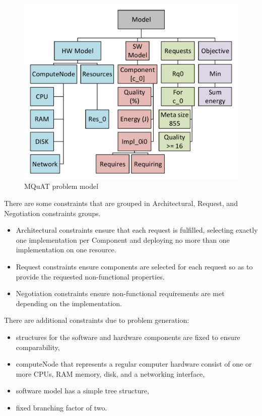 \begin{figure}
	\centering
	\includegraphics[width=\textwidth]{images/MQuATModel}
	\caption[MQuAT problem model]{MQuAT problem model}
	\label{fig:mquatmodel}
\end{figure}

There are some constraints that are grouped in Architectural, Request, and Negotiation constraints groups.
\begin{itemize}
	\item Architectural constraints ensure that each request is fulfilled, selecting exactly one implementation per Component and deploying no more than one implementation on one resource.
	\item Request constraints ensure components are selected for each request so as to provide the requested non-functional properties.
	\item Negotiation constraints ensure non-functional requirements are met depending on the implementation.
\end{itemize}
There are additional constraints due to problem generation:
\begin{itemize}
	\item structures for the software and hardware components are fixed to ensure comparability,
	\item computeNode that represents a regular computer hardware consist of one or more CPUs, RAM memory, disk, and a networking interface,
	\item software model has a simple tree structure,
	\item fixed branching factor of two.
\end{itemize}

